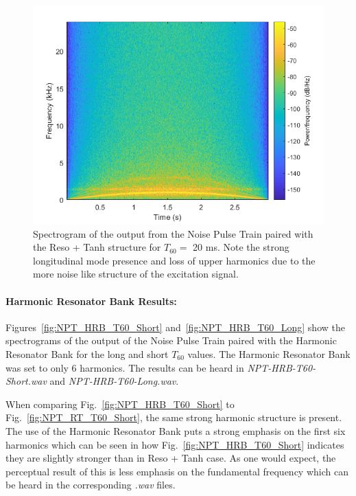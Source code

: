 \documentclass[../main.tex]{subfiles}
\begin{document}
\begin{figure}[h!]
    \centering
    \includegraphics[scale=.60]{./images/plots/NPTResoTanhT60Long.png}
    \caption{Spectrogram of the output from the Noise Pulse Train paired with the Reso + Tanh structure for $T_{60} = $ 20 ms. Note the strong longitudinal mode presence and loss of upper harmonics due to the more noise like structure of the excitation signal.}
    \label{fig:NPT_RT_T60_Long}
\end{figure}

\clearpage

\paragraph{Harmonic Resonator Bank Results:}
Figures~\ref{fig:NPT_HRB_T60_Short} and~\ref{fig:NPT_HRB_T60_Long} show the spectrograms of the output of the Noise Pulse Train paired with the Harmonic Resonator Bank for the long and short $T_{60}$ values. The Harmonic Resonator Bank was set to only 6 harmonics. The results can be heard in \emph{NPT-HRB-T60-Short.wav} and \emph{NPT-HRB-T60-Long.wav}.

When comparing Fig.~\ref{fig:NPT_HRB_T60_Short} to Fig.~\ref{fig:NPT_RT_T60_Short}, the same strong harmonic structure is present. The use of the Harmonic Resonator Bank puts a strong emphasis on the first six harmonics which can be seen in how Fig.~\ref{fig:NPT_HRB_T60_Short} indicates they are slightly stronger than in Reso + Tanh case. As one would expect, the perceptual result of this is less emphasis on the fundamental frequency which can be heard in the corresponding \emph{.wav} files.
\end{document}
